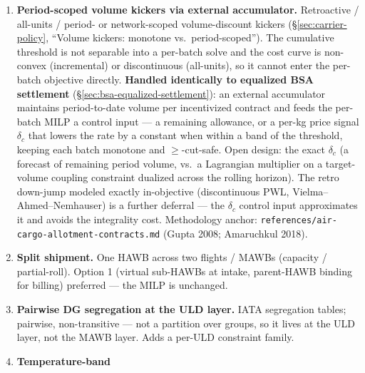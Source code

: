\documentclass[11pt,a4paper]{article}
\theoremstyle{definition}
\begin{document}
\begin{enumerate}
{        PROMOTED to MVP.} The $W_k \cdot \tau_k^2$ penalty (PWL outer
        approximation, \S\ref{sec:lin-tardiness}) replaced the prior linear
        $w \cdot \tau_k$ form. Combined with the per-HAWB fallback arc
        (\S\ref{sec:fallback-arc}), the model is always feasible and
        prefers \emph{reasonable} lateness over concentrated breach. Retained
        in this list for changelog traceability only.
  \item \label{item:volume-kicker-accumulator} \textbf{Period-scoped volume
        kickers via external accumulator.} Retroactive / all-units / period-
        or network-scoped volume-discount kickers (\S\ref{sec:carrier-policy},
        ``Volume kickers: monotone vs.\ period-scoped''). The cumulative
        threshold is not separable into a per-batch solve and the cost curve is
        non-convex (incremental) or discontinuous (all-units), so it cannot
        enter the per-batch objective directly. \textbf{Handled identically to
        equalized BSA settlement} (\S\ref{sec:bsa-equalized-settlement}): an
        external accumulator maintains period-to-date volume per incentivized
        contract and feeds the per-batch MILP a control input --- a remaining
        allowance, or a per-kg price signal $\delta_c$ that lowers the rate by
        a constant when within a band of the threshold, keeping each batch
        monotone and $\geq$-cut-safe. Open design: the exact $\delta_c$ (a
        forecast of remaining period volume, vs.\ a Lagrangian multiplier on a
        target-volume coupling constraint dualized across the rolling horizon).
        The retro down-jump modeled exactly in-objective (discontinuous PWL,
        Vielma--Ahmed--Nemhauser) is a further deferral --- the $\delta_c$
        control input approximates it and avoids the integrality cost.
        Methodology anchor: \texttt{references/air-cargo-allotment-contracts.md}
        (Gupta 2008; Amaruchkul 2018).
  \item \label{item:split-shipment} \textbf{Split shipment.} One HAWB across
        two flights / MAWBs (capacity / partial-roll). Option 1 (virtual
        sub-HAWBs at intake, parent-HAWB binding for billing) preferred ---
        the MILP is unchanged.
  \item \label{item:pairwise-dg-segregation} \textbf{Pairwise DG segregation
        at the ULD layer.} IATA segregation tables; pairwise, non-transitive
        --- not a partition over groups, so it lives at the ULD layer, not
        the MAWB layer. Adds a per-ULD constraint family.
  \item \label{item:temp-band-refinement} \textbf{Temperature-band
}
\end{enumerate}
\end{document}
